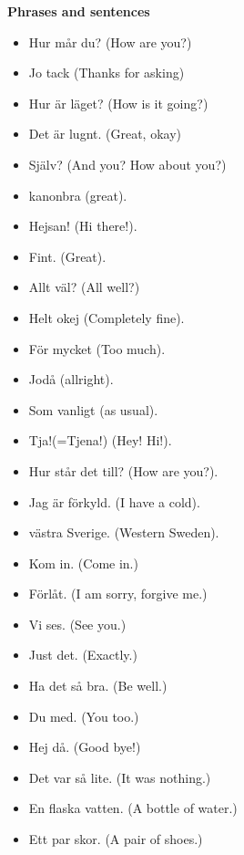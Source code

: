 
\begin{flushleft}
    \textbf{Phrases and sentences}
    \begin{itemize}
        \item Hur mår du? (How are you?)
        \item Jo tack (Thanks for asking)
        \item Hur är läget? (How is it going?)
        \item Det är lugnt. (Great, okay)
        \item Själv? (And you? How about you?)
        \item kanonbra (great).
        \item Hejsan! (Hi there!).
        \item Fint. (Great).
        \item Allt väl? (All well?)
        \item Helt okej (Completely fine).
        \item För mycket (Too much).
        \item Jodå (allright).
        \item Som vanligt (as usual).
        \item Tja!(=Tjena!) (Hey! Hi!).
        \item Hur står det till? (How are you?).
        \item Jag är förkyld. (I have a cold).
        \item västra Sverige. (Western Sweden).
        \item Kom in. (Come in.)
        \item Förlåt. (I am sorry, forgive me.)
        \item Vi ses. (See you.)
        \item Just det. (Exactly.)
        \item Ha det så bra. (Be well.)
        \item Du med. (You too.)
        \item Hej då. (Good bye!)
        \item Det var så lite. (It was nothing.)
        \item En flaska vatten. (A bottle of water.)
        \item Ett par skor. (A pair of shoes.)
    \end{itemize}
\end{flushleft}

